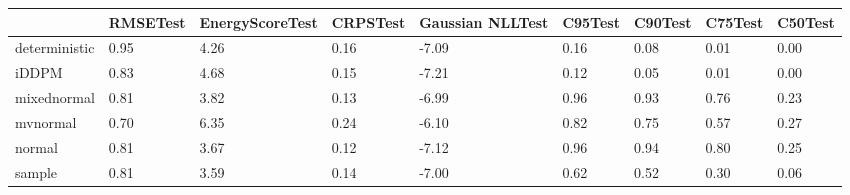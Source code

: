 \begin{tabular}{lllllllll}
\toprule
 & RMSETest & EnergyScoreTest & CRPSTest & Gaussian NLLTest & C95Test & C90Test & C75Test & C50Test \\
\midrule
deterministic & 0.95 & 4.26 & 0.16 & -7.09 & 0.16 & 0.08 & 0.01 & 0.00 \\
iDDPM & 0.83 & 4.68 & 0.15 & -7.21 & 0.12 & 0.05 & 0.01 & 0.00 \\
mixednormal & 0.81 & 3.82 & 0.13 & -6.99 & 0.96 & 0.93 & 0.76 & 0.23 \\
mvnormal & 0.70 & 6.35 & 0.24 & -6.10 & 0.82 & 0.75 & 0.57 & 0.27 \\
normal & 0.81 & 3.67 & 0.12 & -7.12 & 0.96 & 0.94 & 0.80 & 0.25 \\
sample & 0.81 & 3.59 & 0.14 & -7.00 & 0.62 & 0.52 & 0.30 & 0.06 \\
\bottomrule
\end{tabular}
